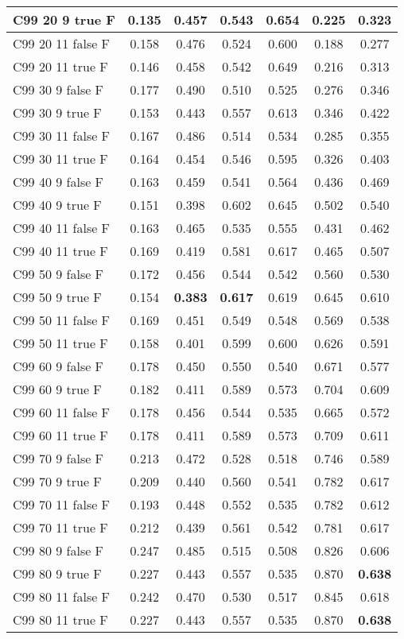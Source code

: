 \documentclass{article}
\begin{document}
\begin{tabular}{|l|c|c|c|c|c|c|}
C99 20  9 true F & \textbf{0.135} & 0.457 & 0.543 & \textbf{0.654} & 0.225 & 0.323\\ \hline
C99 20 11 false F & 0.158 & 0.476 & 0.524 & 0.600 & 0.188 & 0.277\\ \hline
C99 20 11 true F & 0.146 & 0.458 & 0.542 & 0.649 & 0.216 & 0.313\\ \hline
C99 30  9 false F & 0.177 & 0.490 & 0.510 & 0.525 & 0.276 & 0.346\\ \hline
C99 30  9 true F & 0.153 & 0.443 & 0.557 & 0.613 & 0.346 & 0.422\\ \hline
C99 30 11 false F & 0.167 & 0.486 & 0.514 & 0.534 & 0.285 & 0.355\\ \hline
C99 30 11 true F & 0.164 & 0.454 & 0.546 & 0.595 & 0.326 & 0.403\\ \hline
C99 40  9 false F & 0.163 & 0.459 & 0.541 & 0.564 & 0.436 & 0.469\\ \hline
C99 40  9 true F & 0.151 & 0.398 & 0.602 & 0.645 & 0.502 & 0.540\\ \hline
C99 40 11 false F & 0.163 & 0.465 & 0.535 & 0.555 & 0.431 & 0.462\\ \hline
C99 40 11 true F & 0.169 & 0.419 & 0.581 & 0.617 & 0.465 & 0.507\\ \hline
C99 50  9 false F & 0.172 & 0.456 & 0.544 & 0.542 & 0.560 & 0.530\\ \hline
C99 50  9 true F & 0.154 & \textbf{0.383} & \textbf{0.617} & 0.619 & 0.645 & 0.610\\ \hline
C99 50 11 false F & 0.169 & 0.451 & 0.549 & 0.548 & 0.569 & 0.538\\ \hline
C99 50 11 true F & 0.158 & 0.401 & 0.599 & 0.600 & 0.626 & 0.591\\ \hline
C99 60  9 false F & 0.178 & 0.450 & 0.550 & 0.540 & 0.671 & 0.577\\ \hline
C99 60  9 true F & 0.182 & 0.411 & 0.589 & 0.573 & 0.704 & 0.609\\ \hline
C99 60 11 false F & 0.178 & 0.456 & 0.544 & 0.535 & 0.665 & 0.572\\ \hline
C99 60 11 true F & 0.178 & 0.411 & 0.589 & 0.573 & 0.709 & 0.611\\ \hline
C99 70  9 false F & 0.213 & 0.472 & 0.528 & 0.518 & 0.746 & 0.589\\ \hline
C99 70  9 true F & 0.209 & 0.440 & 0.560 & 0.541 & 0.782 & 0.617\\ \hline
C99 70 11 false F & 0.193 & 0.448 & 0.552 & 0.535 & 0.782 & 0.612\\ \hline
C99 70 11 true F & 0.212 & 0.439 & 0.561 & 0.542 & 0.781 & 0.617\\ \hline
C99 80  9 false F & 0.247 & 0.485 & 0.515 & 0.508 & 0.826 & 0.606\\ \hline
C99 80  9 true F & 0.227 & 0.443 & 0.557 & 0.535 & 0.870 & \textbf{0.638}\\ \hline
C99 80 11 false F & 0.242 & 0.470 & 0.530 & 0.517 & 0.845 & 0.618\\ \hline
C99 80 11 true F & 0.227 & 0.443 & 0.557 & 0.535 & 0.870 & \textbf{0.638}\\ \hline
\end{tabular} 
\end{document}
